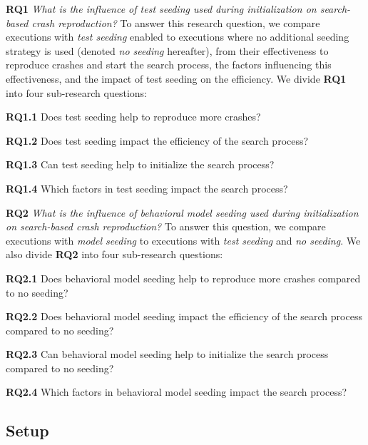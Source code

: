 \medskip \textbf{RQ1} \emph{What is the influence of test seeding used during initialization on search-based crash reproduction?}
%
To answer this research question, we compare \botsing executions with \emph{test seeding} enabled to executions where no additional seeding strategy is used (denoted \emph{no seeding} hereafter), from their effectiveness to reproduce crashes and start the search process, the factors influencing this effectiveness, and the impact of test seeding on the efficiency. We divide \textbf{RQ1}  into four sub-research questions:
%
\begin{compactitem}
    \item[\textbf{RQ1.1}] Does test seeding help to reproduce more crashes?
    \item[\textbf{RQ1.2}] Does test seeding impact the efficiency of the search process?
    \item[\textbf{RQ1.3}] Can test seeding help to initialize the search process? 
    \item[\textbf{RQ1.4}] Which factors in test seeding impact the search process?
\end{compactitem}

\medskip \textbf{RQ2}  \emph{What is the influence of behavioral model seeding used during initialization on search-based crash reproduction?}
%
To answer this question, we compare \botsing executions with \emph{model seeding} to executions with \emph{test seeding} and \emph{no seeding}. We also divide \textbf{RQ2}  into four sub-research questions:
%
\begin{compactitem}
    \item[\textbf{RQ2.1}] Does behavioral model seeding help to reproduce more crashes compared to no seeding?

    \item[\textbf{RQ2.2}] Does behavioral model seeding impact the efficiency of the search process compared to no seeding?
    \item[\textbf{RQ2.3}] Can behavioral model seeding help to initialize the search process compared to no seeding? 
    \item[\textbf{RQ2.4}] Which factors in behavioral model seeding impact the search process?
\end{compactitem}


\subsection{Setup}
\label{sec:setup:setup}

